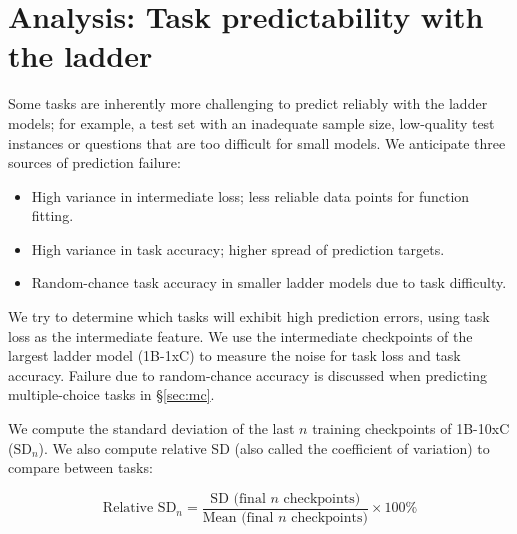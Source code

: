 \section{Analysis: Task predictability with the ladder}
\label{sec_variance_analysis}


Some tasks are inherently more challenging to predict reliably with the ladder models; 
for example, a test set with an inadequate sample size, low-quality test instances or questions that are too difficult for small models. We anticipate three sources of prediction failure: 

\begin{itemize}[leftmargin=16pt]
\item High variance in intermediate loss; less reliable data points for function fitting.
\item High variance in task accuracy; higher spread of prediction targets.
\item Random-chance task accuracy in smaller ladder models due to task difficulty.
\end{itemize}

We try to determine which tasks will exhibit high prediction errors, using task loss as the intermediate feature. We use the intermediate checkpoints of the largest ladder model (1B-1xC) to measure the noise for task loss and task accuracy. Failure due to random-chance accuracy is discussed when predicting multiple-choice tasks in \S\ref{sec:mc}.


We compute the standard deviation of the last $n$ training checkpoints of 1B-10xC ($\text{SD}_n$). We also compute relative SD (also called the coefficient of variation) to compare between tasks:

\begin{equation} \label{eq:cv}
\text{Relative SD}_{n} = \frac{\text{SD (final $n$ checkpoints)}}{\text{Mean (final $n$ checkpoints)}} \times 100\%
\end{equation}

